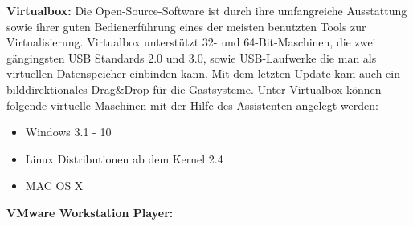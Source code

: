 \textbf{Virtualbox:} Die Open-Source-Software ist durch ihre umfangreiche Ausstattung sowie ihrer 
guten Bedienerführung eines der meisten benutzten Tools zur Virtualisierung. Virtualbox unterstützt 32- 
und 64-Bit-Maschinen, die zwei gängingsten USB Standards 2.0 und 3.0, sowie USB-Laufwerke die man als 
virtuellen Datenspeicher einbinden kann. Mit dem letzten Update kam auch ein bilddirektionales Drag\&Drop 
für die Gastsysteme. Unter Virtualbox können folgende virtuelle Maschinen mit der Hilfe des Assistenten 
angelegt werden:
\begin{itemize}
        \item Windows 3.1 - 10
        \item Linux Distributionen ab dem Kernel 2.4
        \item MAC OS X
\end{itemize} 


\textbf{VMware Workstation Player:} 
 
